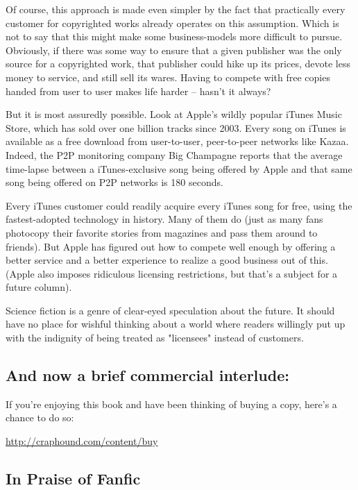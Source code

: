 Of course, this approach is made even simpler by the fact that
practically every customer for copyrighted works already operates
on this assumption. Which is not to say that this might make some
business-models more difficult to pursue. Obviously, if there was
some way to ensure that a given publisher was the only source for a
copyrighted work, that publisher could hike up its prices, devote
less money to service, and still sell its wares. Having to compete
with free copies handed from user to user makes life harder --
hasn't it always?

But it is most assuredly possible. Look at Apple's wildly popular
iTunes Music Store, which has sold over one billion tracks since
2003. Every song on iTunes is available as a free download from
user-to-user, peer-to-peer networks like Kazaa. Indeed, the P2P
monitoring company Big Champagne reports that the average
time-lapse between a iTunes-exclusive song being offered by Apple
and that same song being offered on P2P networks is 180 seconds.

Every iTunes customer could readily acquire every iTunes song for
free, using the fastest-adopted technology in history. Many of them
do (just as many fans photocopy their favorite stories from
magazines and pass them around to friends). But Apple has figured
out how to compete well enough by offering a better service and a
better experience to realize a good business out of this. (Apple
also imposes ridiculous licensing restrictions, but that's a
subject for a future column).

Science fiction is a genre of clear-eyed speculation about the
future. It should have no place for wishful thinking about a world
where readers willingly put up with the indignity of being treated
as "licensees" instead of customers.

\subsection{And now a brief commercial interlude:}

If you're enjoying this book and have been thinking of buying a
copy, here's a chance to do so:

\href{http://craphound.com/content/buy}{http://craphound.com/content/buy}

\subsection{In Praise of Fanfic}

